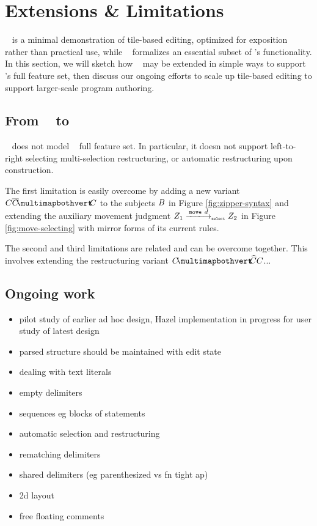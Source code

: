 \section{Extensions \& Limitations}

\tylr~ is a minimal demonstration of tile-based
editing, optimized for exposition rather than practical use,
while \ty~ formalizes an essential subset of \tylr's functionality.
In this section, we will sketch how \ty~ may be extended
in simple ways to support \tylr's full feature set,
then discuss our ongoing efforts to scale up tile-based
editing to support larger-scale program authoring.

\subsection{From \ty~ to \tylr}

\ty~ does not model \tylr~ full feature set.
In particular, it doesn not support left-to-right selecting
multi-selection restructuring, or automatic restructuring
upon construction.

The first limitation is easily overcome by adding
a new variant $\selectingRight{\selection}{\selection}{\selection}$
to the subjects $B$ in Figure \ref{fig:zipper-syntax}
and extending the auxiliary movement judgment
$\smove{\editState_1}{\direction}{\editState_2}$
in Figure \ref{fig:move-selecting}
with mirror forms of its current rules.

The second and third limitations are related
and can be overcome together.
This involves extending
the restructuring variant $\restructuring{\selection}{\selection}{\selection}$...


\subsection{Ongoing work}


\begin{itemize}
\item pilot study of earlier ad hoc design, Hazel implementation in progress for user study of latest design
\item parsed structure should be maintained with edit state
\item dealing with text literals
\item empty delimiters
\item sequences eg blocks of statements
\item automatic selection and restructuring
\item rematching delimiters
\item shared delimiters (eg parenthesized vs fn tight ap)
\item 2d layout
\item free floating comments
\end{itemize}